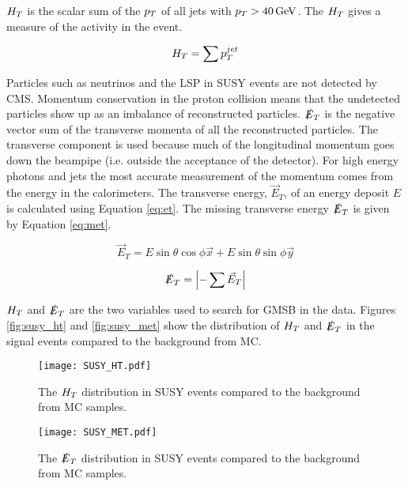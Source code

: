 $H_{T}$ is the scalar sum of the $p_{T}$ of all jets with $p_{T} > 40\, \mathrm{GeV}$. The
$H_{T}$ gives a measure of the activity in the event.

\begin{equation}
H_{T} = \sum p_{T}^{jet}
\end{equation}

Particles such as neutrinos and the LSP in SUSY events are not detected by CMS.
Momentum conservation in the proton collision means that the undetected 
particles show up as an imbalance of reconstructed particles. $\slashed{E}_{T}$ is the
negative vector sum of the transverse momenta of all the reconstructed
particles. The transverse component is used because much of the longitudinal
momentum goes down the beampipe (i.e. outside the acceptance of the detector). 
For high energy photons and jets the most accurate measurement of the
momentum comes from the energy in the calorimeters. The transverse energy,
$\vec{E}_{T}$, of an energy deposit $E$ is calculated using Equation 
\ref{eq:et}. The missing transverse energy $\slashed{E}_{T}$ is given by Equation
\ref{eq:met}.

\begin{equation}
\vec{E}_{T} = E\sin{\theta}\cos{\phi}\vec{x} + E\sin{\theta}\sin{\phi}\vec{y}
\label{eq:et}
\end{equation}

\begin{equation}
\slashed{E}_{T} = \left| - \sum \vec{E}_{T} \right|
\label{eq:met}
\end{equation}

$H_{T}$ and $\slashed{E}_{T}$ are the two variables used to search for GMSB in the data.
Figures \ref{fig:susy_ht} and \ref{fig:susy_met} show the distribution of $H_{T}$ 
and $\slashed{E}_{T}$ in the signal events compared to the background from MC.

\begin{figure}
\begin{center}
\texttt{[image: SUSY\_HT.pdf]}
\end{center}
\caption{The $H_{T}$ distribution in SUSY events compared to the background from
MC samples.}
\end{figure} 

\begin{figure}
\begin{center}
\texttt{[image: SUSY\_MET.pdf]}
\end{center}
\caption{The $\slashed{E}_{T}$ distribution in SUSY events compared to the background from
MC samples.}
\end{figure} 

